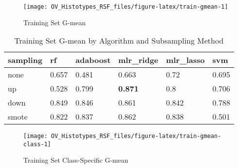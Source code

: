 \documentclass[
]{report}
\begin{document}
\begin{figure}[H]

{\centering \texttt{[image: OV\_Histotypes\_RSF\_files/figure-latex/train-gmean-1]} 

}

\caption{Training Set G-mean}\label{fig:train-gmean}
\end{figure}

\begin{table}

\caption{\label{tab:train-gmean-table}Training Set G-mean by Algorithm and Subsampling Method}
\centering
\begin{tabular}[t]{l|l|l|l|l|l}
\hline
sampling & rf & adaboost & mlr\_ridge & mlr\_lasso & svm\\
\hline
none & 0.657 & 0.481 & 0.663 & 0.72 & 0.695\\
\hline
up & 0.528 & 0.799 & \textbf{0.871} & 0.8 & 0.706\\
\hline
down & 0.849 & 0.846 & 0.861 & 0.842 & 0.788\\
\hline
smote & 0.822 & 0.837 & 0.862 & 0.838 & 0.501\\
\hline
\end{tabular}
\end{table}

\begin{figure}[H]

{\centering \texttt{[image: OV\_Histotypes\_RSF\_files/figure-latex/train-gmean-class-1]} 

}

\caption{Training Set Class-Specific G-mean}\label{fig:train-gmean-class}
\end{figure}
\end{document}
